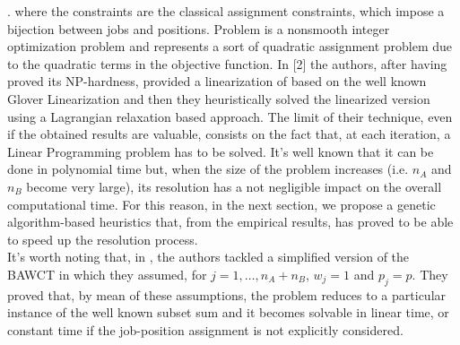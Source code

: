 \documentclass[opre,nonblindrev]{informs3} %
\begin{document}
\ea
\right.
\ee
where the constraints are the classical assignment constraints, which impose a bijection between jobs and positions. 
Problem  is a nonsmooth integer optimization problem and represents a sort of quadratic assignment problem due to the quadratic terms in the objective function. In [2] the authors, after having proved its NP-hardness, provided a linearization of  based on the well known Glover Linearization and then they heuristically solved the linearized version using a Lagrangian relaxation based approach. The limit of their technique, even if the obtained results are valuable, consists on the fact that, at each iteration, a Linear Programming problem has to be solved. It's well known that it can be done in polynomial time but, when the size of the problem increases (i.e. $n_A$ and $n_B$ become very large), its resolution has a not negligible impact on the overall computational time. For this reason, in the next section, we propose a genetic algorithm-based heuristics that, from the empirical results, has proved to be able to speed up the resolution process.\\
It's worth noting that, in \cite{av-fud20}, the authors tackled a simplified version of the BAWCT in which they assumed, for $j=1,\ldots,n_A+n_B$, $w_j=1$ and $p_j=p$. They proved that, by mean of these assumptions, the problem reduces to a particular instance of the well known subset sum and it becomes solvable in linear time, or constant time if the job-position assignment is not explicitly considered.
\end{document}
